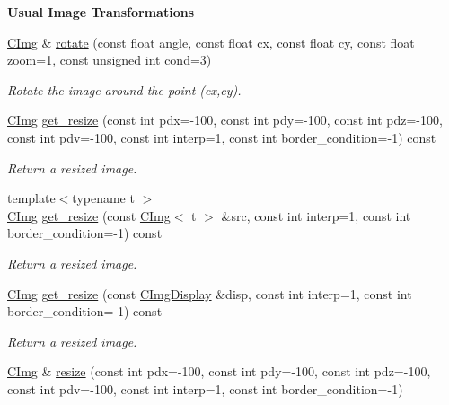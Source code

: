 \begin{Indent}{\bf Usual Image Transformations}
\begin{DoxyCompactItemize}
\hyperlink{structcimg__library_1_1_c_img}{CImg} \& \hyperlink{structcimg__library_1_1_c_img_a3ceb47fd1c1eec978ee782f653130533}{rotate} (const float angle, const float cx, const float cy, const float zoom=1, const unsigned int cond=3)
\begin{DoxyCompactList}\small\item\em Rotate the image around the point ({\ttfamily cx},{\ttfamily cy}). \item\end{DoxyCompactList}\item 
\hyperlink{structcimg__library_1_1_c_img}{CImg} \hyperlink{structcimg__library_1_1_c_img_ababc8a96d142815637c32afbd9df9e48}{get\_\-resize} (const int pdx=-\/100, const int pdy=-\/100, const int pdz=-\/100, const int pdv=-\/100, const int interp=1, const int border\_\-condition=-\/1) const 
\begin{DoxyCompactList}\small\item\em Return a resized image. \item\end{DoxyCompactList}\item 
{\footnotesize template$<$typename t $>$ }\\\hyperlink{structcimg__library_1_1_c_img}{CImg} \hyperlink{structcimg__library_1_1_c_img_aea04c9d6f49e9afafb781c2022e3c6b5}{get\_\-resize} (const \hyperlink{structcimg__library_1_1_c_img}{CImg}$<$ t $>$ \&src, const int interp=1, const int border\_\-condition=-\/1) const 
\begin{DoxyCompactList}\small\item\em Return a resized image. \item\end{DoxyCompactList}\item 
\hyperlink{structcimg__library_1_1_c_img}{CImg} \hyperlink{structcimg__library_1_1_c_img_ab86100a5d3d4d50d1dcc2b9ef7ecfa1b}{get\_\-resize} (const \hyperlink{structcimg__library_1_1_c_img_display}{CImgDisplay} \&disp, const int interp=1, const int border\_\-condition=-\/1) const 
\begin{DoxyCompactList}\small\item\em Return a resized image. \item\end{DoxyCompactList}\item 
\hyperlink{structcimg__library_1_1_c_img}{CImg} \& \hyperlink{structcimg__library_1_1_c_img_a84970d569f01fc5f9370d9cc84428903}{resize} (const int pdx=-\/100, const int pdy=-\/100, const int pdz=-\/100, const int pdv=-\/100, const int interp=1, const int border\_\-condition=-\/1)

\end{DoxyCompactItemize}
\end{Indent}
